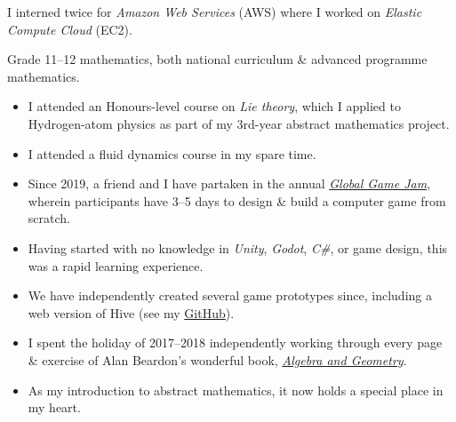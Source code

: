 \documentclass[10pt,a4paper,ragged2e,withhyper]{altacv}
\begin{document}
\begin{paracol}{2}
\divider %

\smallskip
I interned twice for \textit{Amazon Web Services} (AWS) where I worked on \textit{Elastic Compute Cloud} (EC2).

\divider %

\smallskip
Grade 11--12 mathematics, both national curriculum \& advanced programme mathematics.

\medskip

\begin{itemize}
\item I attended an Honours-level course on \textit{Lie theory}, which I applied to Hydrogen-atom physics as
	part of my 3rd-year abstract mathematics project.
\item I attended a fluid dynamics course in my spare time.
\end{itemize}
\smallskip

\begin{itemize}
\item Since 2019, a friend and I have partaken in the annual
	\href{https://globalgamejam.org/about}{\emph{Global Game Jam}}, wherein participants have 3--5 days to design
	\& build a computer game from scratch.
\item Having started with no knowledge in \emph{Unity}, \emph{Godot}, \emph{C\#}, or game design, this was
	a rapid learning experience.
\item We have independently created several game prototypes since, including a web version of Hive
	(see my \href{https://github.com/dariotrinchero}{GitHub}).
\end{itemize}
\smallskip

\begin{itemize}
\item I spent the holiday of 2017--2018 independently working through every page \& exercise of
	Alan Beardon's wonderful book,
	\href{https://www.cambridge.org/za/universitypress/subjects/mathematics/algebra/algebra-and-geometry}%
	{\emph{Algebra and Geometry}}.
\item As my introduction to abstract mathematics, it now holds a special place in my heart.
\end{itemize}
\smallskip


\end{paracol}
\end{document}
